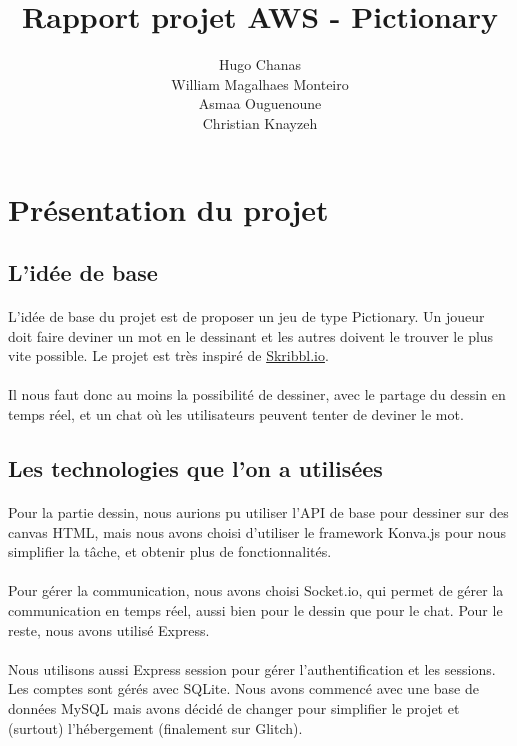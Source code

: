 \documentclass[11pt,a4paper]{article}
\date{}
\title{Rapport projet AWS - Pictionary}
\author{ Hugo Chanas \\ William Magalhaes Monteiro \\ Asmaa Ouguenoune \\ Christian Knayzeh }
\begin{document}
    \maketitle
    \section{Présentation du projet}
        \subsection{L'idée de base}
            \paragraph{}
            L'idée de base du projet est de proposer un jeu de type Pictionary.
            Un joueur doit faire deviner un mot en le dessinant et les autres doivent le trouver le plus vite possible.
            Le projet est très inspiré de \href{https://skribbl.io/}{Skribbl.io}.
            \paragraph{}
            Il nous faut donc au moins la possibilité de dessiner, avec le partage du dessin en temps réel,
            et un chat où les utilisateurs peuvent tenter de deviner le mot.
        \subsection{Les technologies que l'on a utilisées}
            \paragraph{}
            Pour la partie dessin, nous aurions pu utiliser l'API de base pour dessiner sur des canvas HTML,
            mais nous avons choisi d'utiliser le framework Konva.js pour nous simplifier la tâche, et obtenir plus de fonctionnalités.
            \paragraph{}
            Pour gérer la communication, nous avons choisi Socket.io, qui permet de gérer la communication en temps réel,
            aussi bien pour le dessin que pour le chat. Pour le reste, nous avons utilisé Express.
            \paragraph{}
            Nous utilisons aussi Express session pour gérer l'authentification et les sessions.
            Les comptes sont gérés avec SQLite.
            Nous avons commencé avec une base de données MySQL mais avons décidé de changer pour simplifier le projet et (surtout) l'hébergement (finalement sur Glitch).
\end{document}
